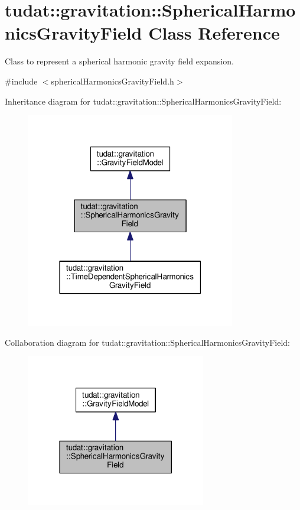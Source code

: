 \hypertarget{classtudat_1_1gravitation_1_1SphericalHarmonicsGravityField}{}\section{tudat\+:\+:gravitation\+:\+:Spherical\+Harmonics\+Gravity\+Field Class Reference}
\label{classtudat_1_1gravitation_1_1SphericalHarmonicsGravityField}


Class to represent a spherical harmonic gravity field expansion.  




{\ttfamily \#include $<$spherical\+Harmonics\+Gravity\+Field.\+h$>$}



Inheritance diagram for tudat\+:\+:gravitation\+:\+:Spherical\+Harmonics\+Gravity\+Field\+:
\nopagebreak
\begin{figure}[H]
\begin{center}
\leavevmode
\includegraphics[width=259pt]{classtudat_1_1gravitation_1_1SphericalHarmonicsGravityField__inherit__graph}
\end{center}
\end{figure}


Collaboration diagram for tudat\+:\+:gravitation\+:\+:Spherical\+Harmonics\+Gravity\+Field\+:
\nopagebreak
\begin{figure}[H]
\begin{center}
\leavevmode
\includegraphics[width=222pt]{classtudat_1_1gravitation_1_1SphericalHarmonicsGravityField__coll__graph}
\end{center}
\end{figure}
